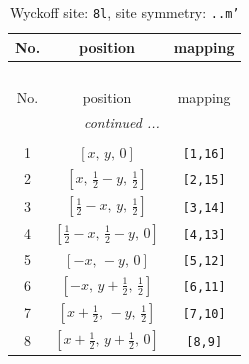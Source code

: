 \documentclass[fleqn,8pt]{jsarticle}
\begin{document}
\begin{longtable}{ccc}
\caption{Wyckoff site: {\tt 8l}, site symmetry: {\tt ..m'}}
 \\
 \hline \hline
No. & position & mapping \\ \hline \endfirsthead

\multicolumn{2}{l}{\tablename\ \thetable{}} \\
 \hline \hline
No. & position & mapping \\ \hline \endhead

 \hline \hline
\multicolumn{2}{r}{\footnotesize\it continued ...} \\ \endfoot

 \hline \hline
\multicolumn{2}{r}{} \\ \endlastfoot

1 & $\left[ x,\, y,\, 0 \right]$ & {\tt [1,16]} \\ \hline
2 & $\left[ x,\, \frac{1}{2} - y,\, \frac{1}{2} \right]$ & {\tt [2,15]} \\ \hline
3 & $\left[ \frac{1}{2} - x,\, y,\, \frac{1}{2} \right]$ & {\tt [3,14]} \\ \hline
4 & $\left[ \frac{1}{2} - x,\, \frac{1}{2} - y,\, 0 \right]$ & {\tt [4,13]} \\ \hline
5 & $\left[ - x,\, - y,\, 0 \right]$ & {\tt [5,12]} \\ \hline
6 & $\left[ - x,\, y + \frac{1}{2},\, \frac{1}{2} \right]$ & {\tt [6,11]} \\ \hline
7 & $\left[ x + \frac{1}{2},\, - y,\, \frac{1}{2} \right]$ & {\tt [7,10]} \\ \hline
8 & $\left[ x + \frac{1}{2},\, y + \frac{1}{2},\, 0 \right]$ & {\tt [8,9]} \\
\end{longtable}
\renewcommand{\arraystretch}{1.2}
\end{document}
